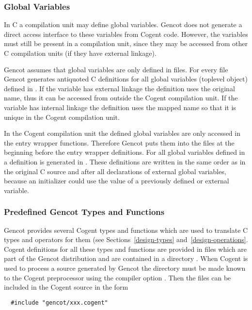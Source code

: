 \subsubsection{Global Variables}

In C a compilation unit may define global variables. Gencot does not generate a direct access interface to these variables
from Cogent code. However, the variables must still be present in a compilation unit, since they may be accessed
from other C compilation units (if they have external linkage). 

Gencot assumes that global variables are only defined in  files. For every file  Gencot generates
antiquoted C definitions for all global variables (toplevel object) defined in . If the variable has 
external linkage the definition uses the original name, thus it can be accessed from outside the Cogent compilation unit. 
If the variable has internal linkage the definition uses the mapped name so that it is unique in the Cogent compilation
unit. 

In the Cogent compilation unit the defined global variables are only accessed in 
the entry wrapper functions. Therefore Gencot puts them into the files  at the beginning before 
the entry wrapper definitions. For all global variables defined in  a definition is generated in 
. These definitions are written in the same order as in the original C source and after all
declarations of external global variables, because an initializer could use the value of a previously defined
or external variable.

\subsubsection{Predefined Gencot Types and Functions}

Gencot provides several Cogent types and functions which are used to translate C types and operators for them
(see Sections~\ref{design-types} and~\ref{design-operations}. Cogent definitions for all these types and functions 
are provided in files which are part of the Gencot distribution and are contained in a directory .
When Cogent is used to process a source generated by Gencot the directory  must be made known to the 
Cogent preprocessor using the compiler option . Then the files can be included in the Cogent
source in the form
\begin{verbatim}
  #include "gencot/xxx.cogent"
\end{verbatim}

